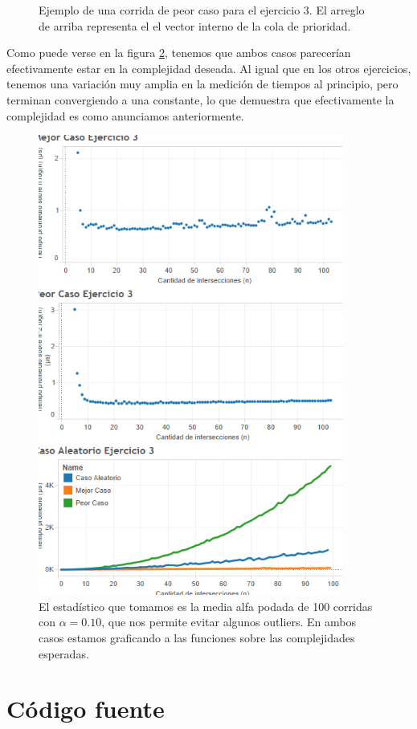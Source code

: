 \documentclass{article}
\theoremstyle{definition}
\theoremstyle{remark}
\begin{document}
\begin{figure}
    \caption{Ejemplo de una corrida de peor caso para el ejercicio 3. El arreglo de arriba representa el el vector interno de la cola de prioridad. \label{grf:ex3-worst}}
\end{figure}

Como puede verse en la figura \ref{grf:ex3}, tenemos que ambos casos parecerían efectivamente estar en la complejidad deseada. Al igual que en los otros ejercicios, tenemos una variación muy amplia en la medición de tiempos al principio, pero terminan convergiendo a una constante, lo que demuestra que efectivamente la complejidad es como anunciamos anteriormente.

\begin{figure}
\centering
\includegraphics[width=10cm]{ex3}
\caption{El estadístico que tomamos es la media alfa podada de 100 corridas con $\alpha = 0.10$, que nos permite evitar algunos outliers. En ambos casos estamos graficando a las funciones sobre las complejidades esperadas.\label{grf:ex3}}
\end{figure}

\pagebreak

\section{Código fuente}
\end{document}
